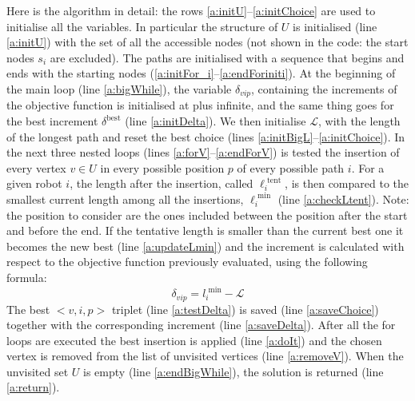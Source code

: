 Here is the algorithm in detail:
the rows \ref{a:initU}--\ref{a:initChoice} are used to initialise all the variables.
In particular the structure of $U$ is initialised (line \ref{a:initU}) with the set of all  the accessible nodes (not shown in the code: the start nodes $s_i$ are excluded).
The paths are initialised with a sequence that begins and ends with the starting nodes  (\ref{a:initFor_i}--\ref{a:endForiniti}). 
At the beginning of the main loop (line \ref{a:bigWhile}),
the variable $\delta_{vip}$, containing the increments of the objective function is initialised at plus infinite, and the same thing goes for the best increment $\delta^{\text{best}}$ (line \ref{a:initDelta}).
We then initialise $\mathcal{L}$, with the length of the longest path and reset the best choice (lines \ref{a:initBigL}--\ref{a:initChoice}).
In the next three nested loops (lines \ref{a:forV}--\ref{a:endForV}) is tested the insertion of every vertex $v \in U$ in every possible position $p$ of every possible path $i$. For a given robot $i$, the length after the insertion, called $\ell_{i}^{\text{ tent}}$, is then compared to the smallest current length among all the insertions,  $\ell_{i}^{\text{ min}}$ (line \ref{a:checkLtent}).
Note: the position to consider are the ones included between the position after the start and before the end. If the tentative length is smaller than the current best one it becomes the new best (line \ref{a:updateLmin}) and the increment is calculated with respect to the objective function previously evaluated, using the following formula:
\begin{equation}\label{e:delta}
\delta_{vip} = l_{i}^{\text{ min}} - \mathcal{L}
\end{equation}
The best $<v,i,p>$ triplet (line \ref{a:testDelta}) is saved (line \ref{a:saveChoice}) together with the corresponding increment (line \ref{a:saveDelta}).
After all the for loops are executed the best insertion is applied (line \ref{a:doIt}) and the chosen vertex is removed from the list of unvisited vertices (line \ref{a:removeV}).
When the unvisited set $U$ is empty (line \ref{a:endBigWhile}), the solution is returned (line \ref{a:return}).


